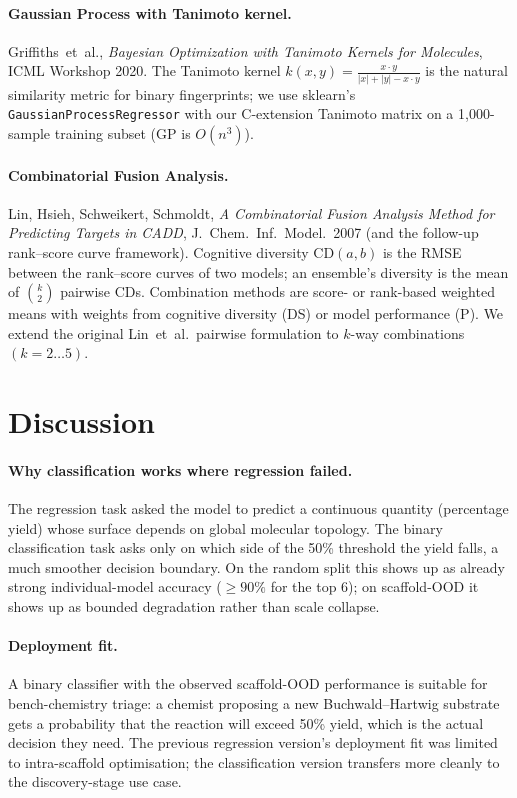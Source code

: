 \documentclass[11pt,a4paper]{article}
\begin{document}
\paragraph{Gaussian Process with Tanimoto kernel.}
Griffiths~et~al., \emph{Bayesian Optimization with Tanimoto Kernels for
Molecules}, ICML Workshop 2020. The Tanimoto kernel
$k(x, y) = \frac{x \cdot y}{|x| + |y| - x \cdot y}$ is the natural similarity
metric for binary fingerprints; we use sklearn's \texttt{GaussianProcessRegressor}
with our C-extension Tanimoto matrix on a 1{,}000-sample training subset
(GP is $O(n^3)$).

\paragraph{Combinatorial Fusion Analysis.}
Lin, Hsieh, Schweikert, Schmoldt, \emph{A Combinatorial Fusion Analysis Method
for Predicting Targets in CADD}, J.\ Chem.\ Inf.\ Model.\ 2007 (and the
follow-up rank--score curve framework). Cognitive diversity $\text{CD}(a, b)$
is the RMSE between the rank--score curves of two models; an ensemble's
diversity is the mean of $\binom{k}{2}$ pairwise CDs. Combination methods are
score- or rank-based weighted means with weights from cognitive diversity (DS)
or model performance (P). We extend the original Lin~et~al.\ pairwise
formulation to $k$-way combinations $(k = 2 \ldots 5)$.

\section{Discussion}

\paragraph{Why classification works where regression failed.}
The regression task asked the model to predict a continuous quantity
(percentage yield) whose surface depends on global molecular topology. The
binary classification task asks only on which side of the 50\% threshold the
yield falls, a much smoother decision boundary. On the random split this
shows up as already strong individual-model accuracy ($\geq 90\%$ for the top
6); on scaffold-OOD it shows up as bounded degradation rather than scale
collapse.

\paragraph{Deployment fit.}
A binary classifier with the observed scaffold-OOD performance is suitable
for bench-chemistry triage: a chemist proposing a new Buchwald--Hartwig
substrate gets a probability that the reaction will exceed 50\% yield, which
is the actual decision they need. The previous regression version's
deployment fit was limited to intra-scaffold optimisation; the classification
version transfers more cleanly to the discovery-stage use case.
\end{document}
